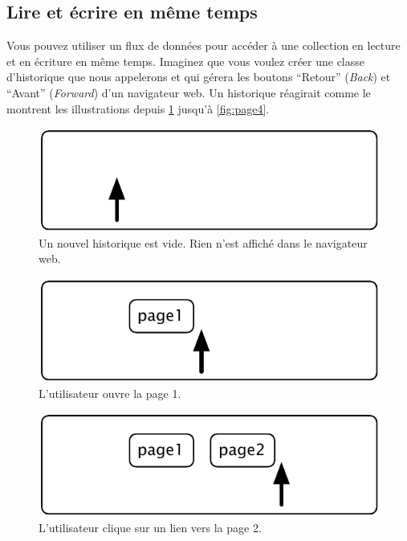 \documentclass[a4paper,10pt,twoside]{book}
\begin{document}
\subsection{Lire et \'ecrire en m\^eme temps}

Vous pouvez utiliser un flux de donn\'ees pour acc\'eder \`a une collection
en lecture et en \'ecriture en m\^eme temps.
Imaginez que vous voulez cr\'eer une classe d'historique que nous appelerons  et qui g\'erera
les boutons ``Retour'' (\emph{Back}) et ``Avant'' (\emph{Forward}) d'un
navigateur web.
Un historique r\'eagirait comme le montrent les illustrations depuis \ref{fig:emptyStream} jusqu'\`a \ref{fig:page4}.

\begin{figure}[!ht]
\centerline{\includegraphics[scale=0.5]{emptyStef}}
\caption{Un nouvel historique est vide. Rien n'est affich\'e dans le navigateur web.}
\label{fig:emptyStream}
\vspace{.2in}
\end{figure}

\begin{figure}[!ht]
\centerline{\includegraphics[scale=0.5]{page1Stef}}
\caption{L'utilisateur ouvre la page 1.}
\label{fig:page1}
\vspace{.2in}
\end{figure}

\begin{figure}[!ht]
\centerline{\includegraphics[scale=0.5]{page2Stef}}
\caption{L'utilisateur clique sur un lien vers la page 2.}
\label{fig:page2}
\vspace{.2in}
\end{figure}
\end{document}
